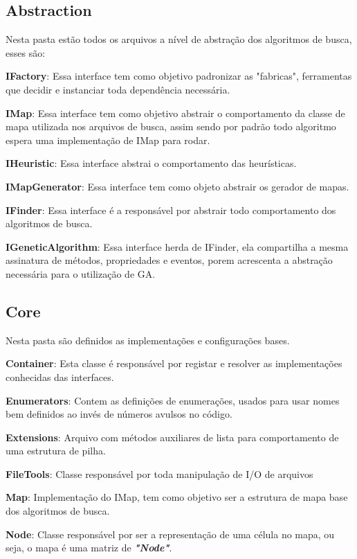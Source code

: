  \subsection{Abstraction}	
 
 Nesta pasta estão todos os arquivos a nível de abstração dos algoritmos de busca, esses são:
 
 \textbf{IFactory}: Essa interface tem como objetivo padronizar as "fabricas", ferramentas que decidir e instanciar toda dependência necessária.
 
 \textbf{IMap}: Essa interface tem como objetivo abstrair o comportamento da classe de mapa utilizada nos arquivos de busca, assim sendo por padrão todo algoritmo espera uma implementação de IMap para rodar.
 
 \textbf{IHeuristic}: Essa interface abstrai o comportamento das heurísticas.
 
 \textbf{IMapGenerator}: Essa interface tem como objeto abstrair os gerador de mapas.
 
 \textbf{IFinder}: Essa interface é a responsável por abstrair todo comportamento dos algoritmos de busca.
 
 \textbf{IGeneticAlgorithm}: Essa interface herda de IFinder, ela compartilha a mesma assinatura de métodos, propriedades e eventos, porem acrescenta a abstração necessária para
 o utilização de GA.
 
 
 \subsection{Core}
 
 Nesta pasta são definidos as implementações e configurações bases.
 
 \textbf{Container}: Esta classe é responsável por registar e resolver as implementações conhecidas das interfaces.
 
 \textbf{Enumerators}: Contem as definições de enumerações, usados para usar nomes bem definidos ao invés de números avulsos no código.
 
 \textbf{Extensions}: Arquivo com métodos auxiliares de lista para comportamento de uma estrutura de pilha.
 
 \textbf{FileTools}: Classe responsável por toda manipulação de I/O de arquivos
 
 \textbf{Map}: Implementação do IMap, tem como objetivo ser a estrutura de mapa base dos algoritmos de busca.
 
 \textbf{Node}: Classe responsável por ser a representação de uma célula no mapa, ou seja, o mapa é uma matriz de \textbf{\textit{"Node"}}.
 
